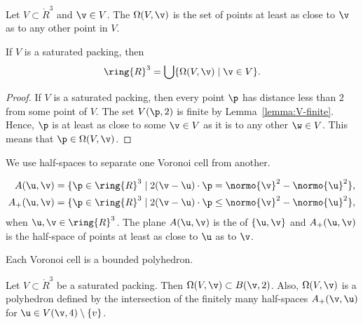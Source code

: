 \begin{definition}\label{def:voronoi} 
Let $V\subset\ring{R}^3$ and $\v\in V$.
The  
$\Omega(V,\v)$
is the set of points at least as close to $\v$ as to
any other point in $V$. 
\end{definition}

\begin{lemma}
If $V$ is a saturated packing, then 
\begin{equation}\label{eqn:vor-rn} 
\ring{R}^3 = \bigcup \{\Omega(V,\v)\mid \v \in V\}.
\end{equation}
\end{lemma}

\begin{proof}
  If $V$ is a saturated packing, then every point $\p$ has distance 
  less than $2$ from some point of $V$.  The set $V(\p,2)$ is finite
  by Lemma~\ref{lemma:V-finite}.  Hence, $\p$ is at least as close to
  some $\v\in V$ as it is to any other $\w\in V$.  This means that
  $\p\in\Omega(V,\v)$.  
\end{proof}

We use half-spaces to separate one Voronoi cell from another.

\begin{definition}
\begin{align*} 
A(\u,\v) &= \{\p\in\ring{R}^3
\mid 2(\v-\u)\cdot \p = \normo{\v}^2 - \normo{\u}^2 \},\\
A_+(\u,\v) &= \{\p\in\ring{R}^3
\mid 2(\v-\u)\cdot \p \le \normo{\v}^2 - \normo{\u}^2 \},
\end{align*}
when $\u,\v\in\ring{R}^3$.  The plane $A(\u,\v)$ is the  of
$\{\u,\v\}$ and $A_+(\u,\v)$ is the half-space of points at least as
close to $\u$ as to $\v$.  
\end{definition}

Each Voronoi cell is a bounded polyhedron.

\begin{lemma}\label{lemma:V4} 
  Let $V\subset\ring{R}^3$ be a saturated packing.  Then
  $\Omega(V,\v)\subset B(\v,2)$.  Also, $\Omega(V,\v)$ is a polyhedron
  defined by the intersection of the finitely many half-spaces
  $A_+(\v,\u)$ for $\u\in V(\v,4)\setminus\{v\}$.
\end{lemma}


